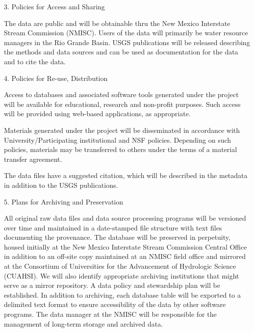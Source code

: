 \documentclass[ignorenonframetext,]{beamer}
\begin{document}
\begin{frame}{3. Policies for Access and Sharing}

The data are public and will be obtainable thru the New Mexico
Interstate Stream Commission (NMISC). Users of the data will primarily
be water resource managers in the Rio Grande Basin. USGS publications
will be released describing the methods and data sources and can be used
as documentation for the data and to cite the data.

\end{frame}

\begin{frame}{4. Policies for Re-use, Distribution}

Access to databases and associated software tools generated under the
project will be available for educational, research and non-profit
purposes. Such access will be provided using web-based applications, as
appropriate.

Materials generated under the project will be disseminated in accordance
with University/Participating institutional and NSF policies. Depending
on such policies, materials may be transferred to others under the terms
of a material transfer agreement.

The data files have a suggested citation, which will be described in the
metadata in addition to the USGS publications.

\end{frame}

\begin{frame}{5. Plans for Archiving and Preservation}

All original raw data files and data source processing programs will be
versioned over time and maintained in a date-stamped file structure with
text files documenting the provenance. The database will be preserved in
perpetuity, housed initially at the New Mexico Interstate Stream
Commission Central Office in addition to an off-site copy maintained at
an NMISC field office and mirrored at the Consortium of Universities for
the Advancement of Hydrologic Science (CUAHSI). We will also identify
appropriate archiving institutions that might serve as a mirror
repository. A data policy and stewardship plan will be established. In
addition to archiving, each database table will be exported to a
delimited text format to ensure accessibility of the data by other
software programs. The data manager at the NMISC will be responsible for
the management of long-term storage and archived data.

\end{frame}
\end{document}
